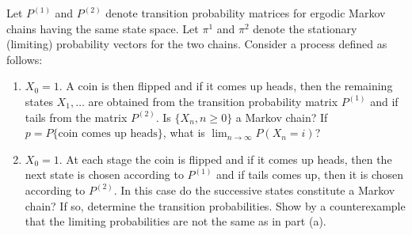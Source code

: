 \begin{exercise}%
\label{ex:markov-chains-49}
Let $P^{(1)}$ and $P^{(2)}$ denote transition probability matrices for ergodic Markov chains having the same state space. Let $\pi^1$ and $\pi^2$ denote the stationary (limiting) probability vectors for the two chains. Consider a process defined as follows:
\begin{enumerate}
\item[(a)] $X_0 = 1$. A coin is then flipped and if it comes up heads, then the remaining states $X_1, \dots$ are obtained from the transition probability matrix $P^{(1)}$ and if tails from the matrix $P^{(2)}$. Is $\{X_n, n \ge 0\}$ a Markov chain? If $p = P\{\text{coin comes up heads}\}$, what is $\lim_{n \to \infty} P(X_n = i)$?
\item[(b)] $X_0 = 1$. At each stage the coin is flipped and if it comes up heads, then the next state is chosen according to $P^{(1)}$ and if tails comes up, then it is chosen according to $P^{(2)}$. In this case do the successive states constitute a Markov chain? If so, determine the transition probabilities. Show by a counterexample that the limiting probabilities are not the same as in part (a).
\end{enumerate}
\end{exercise}

